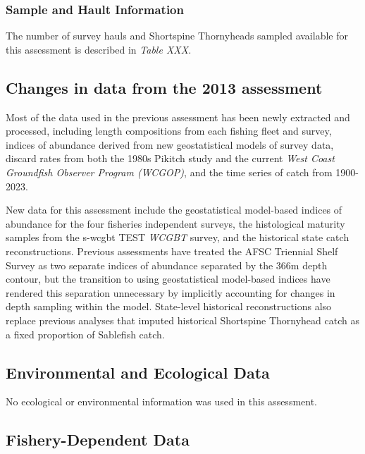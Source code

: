 \documentclass[11pt,
  english,
  letterpaper,
]{article}
\begin{document}
\hypertarget{sample-and-hault-information}{%
\subsubsection{Sample and Hault Information}\label{sample-and-hault-information}}

The number of survey hauls and Shortspine Thornyheads sampled available for this assessment is described in \emph{\emph{Table XXX.}}

\hypertarget{changes-in-data-from-the-2013-assessment}{%
\subsection{Changes in data from the 2013 assessment}\label{changes-in-data-from-the-2013-assessment}}

Most of the data used in the previous assessment has been newly extracted and processed, including length compositions from each fishing fleet and survey, indices of abundance derived from new geostatistical models of survey data, discard rates from both the 1980s Pikitch study and the current \emph{West Coast Groundfish Observer Program (WCGOP)}, and the time series of catch from 1900-2023.

New data for this assessment include the geostatistical model-based indices of abundance for the four fisheries independent surveys, the histological maturity samples from the \gls {s-wcgbt} TEST \emph{WCGBT} survey, and the historical state catch reconstructions. Previous assessments have treated the AFSC Triennial Shelf Survey as two separate indices of abundance separated by the 366m depth contour, but the transition to using geostatistical model-based indices have rendered this separation unnecessary by implicitly accounting for changes in depth sampling within the model. State-level historical reconstructions also replace previous analyses that imputed historical Shortspine Thornyhead catch as a fixed proportion of Sablefish catch.

\hypertarget{environmental-and-ecological-data}{%
\subsection{Environmental and Ecological Data}\label{environmental-and-ecological-data}}

No ecological or environmental information was used in this assessment.

\hypertarget{fishery-dependent-data}{%
\subsection{Fishery-Dependent Data}\label{fishery-dependent-data}}
\end{document}
